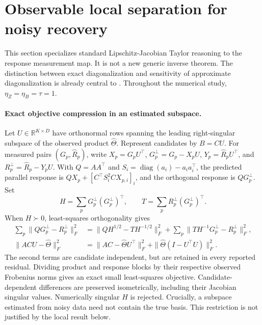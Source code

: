 \section{Observable local separation for noisy recovery}
\label{app:trusted-theory}

This section specializes standard Lipschitz-Jacobian Taylor reasoning
\citep[Section~2, equations (5)--(6)]{behling2018local} to the response
measurement map. It is not a new generic inverse theorem.
The distinction between exact diagonalization and sensitivity of approximate
diagonalization is already central to \citet{afsari2008sensitivity}.
Throughout the numerical study, $\eta_Z=\eta_B=\tau=1$.

\paragraph{Exact objective compression in an estimated subspace.}
Let $U\in\mathbb R^{K\times D}$ have orthonormal rows spanning the leading
right-singular subspace of the observed product $\widehat\Theta$.
Represent candidates by $B=CU$. For measured pairs $(G_p,\widehat R_p)$,
write $X_p=G_pU^\top$, $G_p^\perp=G_p-X_pU$,
$Y_p=\widehat R_pU^\top$, and
$R_p^\perp=\widehat R_p-Y_pU$.
With $Q=AA^\top$ and $S_i=\operatorname{diag}(a_i)-a_i a_i^\top$, the
predicted parallel response is
$QX_p+[C^\top S_i^2 C X_{p,i}]_i$, and the orthogonal response is
$QG_p^\perp$. Set
\[
 H=\sum_pG_p^\perp(G_p^\perp)^\top,\qquad
 T=\sum_pR_p^\perp(G_p^\perp)^\top.
\]
When $H\succ0$, least-squares orthogonality gives
\begin{align}
 \sum_p\|QG_p^\perp-R_p^\perp\|_F^2
 &=\|QH^{1/2}-TH^{-1/2}\|_F^2
   +\sum_p\|TH^{-1}G_p^\perp-R_p^\perp\|_F^2,\\
 \|ACU-\widehat\Theta\|_F^2
 &=\|AC-\widehat\Theta U^\top\|_F^2
   +\|\widehat\Theta(I-U^\top U)\|_F^2.
\end{align}
The second terms are candidate independent, but are retained in every
reported residual. Dividing product and response blocks by their respective
observed Frobenius norms gives an exact small least-squares objective.
Candidate-dependent differences are preserved isometrically, including
their Jacobian singular values. Numerically singular $H$ is rejected.
Crucially, a subspace estimated from noisy data need not contain the true
basis. This restriction is not justified by the local result below.

